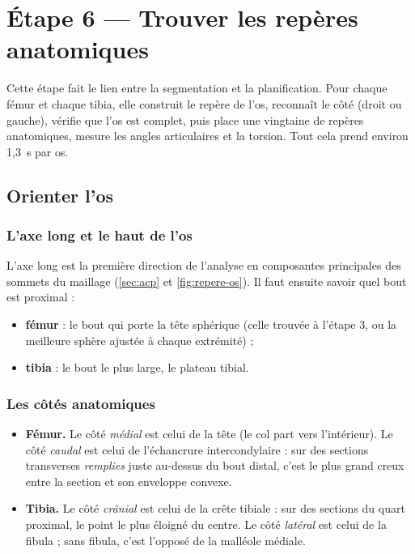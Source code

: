 \chapter{Étape 6 — Trouver les repères anatomiques}
\label{chap:reperes}

\begin{chapeau}
Cette étape fait le lien entre la segmentation et la planification. Pour chaque fémur et chaque tibia, elle construit
le repère de l'os, reconnaît le côté (droit ou gauche), vérifie que l'os est complet, puis place une vingtaine de
repères anatomiques, mesure les angles articulaires et la torsion. Tout cela prend environ 1,3~s par os.
\end{chapeau}

\section{Orienter l'os}
\label{sec:orienter}

\subsection{L'axe long et le haut de l'os}

L'axe long est la première direction de l'analyse en composantes principales des sommets du maillage
(\cref{sec:acp} et \cref{fig:repere-os}). Il faut ensuite savoir quel bout est proximal :
\begin{itemize}
  \item \textbf{fémur} : le bout qui porte la tête sphérique (celle trouvée à l'étape 3, ou la meilleure sphère ajustée
  à chaque extrémité) ;
  \item \textbf{tibia} : le bout le plus large, le plateau tibial.
\end{itemize}


\subsection{Les côtés anatomiques}

\begin{itemize}
  \item \textbf{Fémur.} Le côté \emph{médial} est celui de la tête (le col part vers l'intérieur). Le côté
  \emph{caudal} est celui de l'échancrure intercondylaire : sur des sections transverses \emph{remplies} juste
  au-dessus du bout distal, c'est le plus grand creux entre la section et son enveloppe convexe.
  \item \textbf{Tibia.} Le côté \emph{crânial} est celui de la crête tibiale : sur des sections du quart proximal, le
  point le plus éloigné du centre. Le côté \emph{latéral} est celui de la fibula ; sans fibula, c'est l'opposé de la
  malléole médiale.
\end{itemize}

